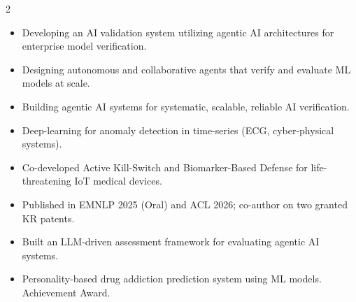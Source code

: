 \documentclass[10pt,letterpaper,withhyper]{altacv}
\begin{document}


\makecvheader

\begin{paracol}{2}


\begin{itemize}
\item Developing an AI validation system utilizing agentic AI architectures for enterprise model verification.
\item Designing autonomous and collaborative agents that verify and evaluate ML models at scale.
\item Building agentic AI systems for systematic, scalable, reliable AI verification.
\end{itemize}

\divider

\begin{itemize}
\item Deep-learning for anomaly detection in time-series (ECG, cyber-physical systems).
\item Co-developed Active Kill-Switch and Biomarker-Based Defense for life-threatening IoT medical devices.
\item Published in EMNLP 2025 (Oral) and ACL 2026; co-author on two granted KR patents.
\end{itemize}

\divider

\begin{itemize}
\item Built an LLM-driven assessment framework for evaluating agentic AI systems.
\end{itemize}

\divider

\begin{itemize}
\item Personality-based drug addiction prediction system using ML models. Achievement Award.
\end{itemize}


\end{paracol}
\end{document}
